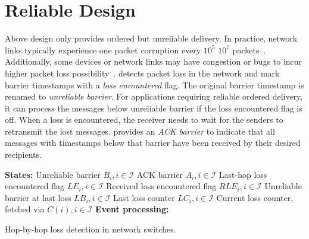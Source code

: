 \section{Reliable \sys Design}
\label{sec:reliable}

Above design only provides ordered but unreliable delivery.
In practice, network links typically experience one packet corruption every $10^5$ \texttildelow $10^7$ packets~\cite{zhuo2017understanding}.
Additionally, some devices or network links may have congestion or bugs to incur higher packet loss possibility~\cite{guo2015pingmesh}.
\sys detects packet loss in the network and mark barrier timestamps with a \textit{loss encountered} flag.
The original barrier timestamp is renamed to \textit{unreliable barrier}.
For applications requiring reliable ordered delivery, it can process the messages below unreliable barrier if the loss encountered flag is off.
When a loss is encountered, the receiver needs to wait for the senders to retransmit the lost messages.
\sys provides an \textit{ACK barrier} to indicate that all messages with timestamps below that barrier have been received by their desired recipients.

\setlength{\textfloatsep}{1em}
\begin{algorithm}[t]
 \DontPrintSemicolon
 \textbf{States:} Unreliable barrier $B_i, i \in \mathcal{I}$\;
 	\qquad ACK barrier $A_i, i \in \mathcal{I}$\;
 	\qquad Last-hop loss encountered flag $LE_i, i \in \mathcal{I}$\;
    \qquad Received loss encountered flag $RLE_i, i \in \mathcal{I}$\;
    \qquad Unreliable barrier at last loss $LB_i, i \in \mathcal{I}$\;
    \qquad Last loss counter $LC_i, i \in \mathcal{I}$\;
    \qquad Current loss counter, fetched via $C(i), i \in \mathcal{I}$\;
 \textbf{Event processing:}\\
 \caption{Hop-by-hop loss detection in network switches.}
 \label{alg:loss-detection}
\end{algorithm}

